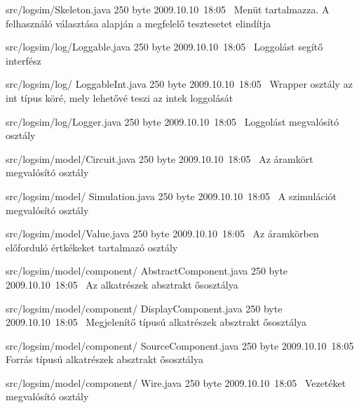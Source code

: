 \begin{fajllista}

\fajl
{src/logsim/Skeleton.java} %
{250 byte} %
{2009.10.10~18:05~} %
{Menüt tartalmazza. A felhasználó választása alapján a megfelelő tesztesetet elindítja} %

\fajl
{src/logsim/log/Loggable.java} %
{250 byte} %
{2009.10.10~18:05~} %
{Loggolást segítő interfész} %

\fajl
{src/logsim/log/\newline
LoggableInt.java} %
{250 byte} %
{2009.10.10~18:05~} %
{Wrapper osztály az int típus köré, mely lehetővé teszi az intek loggolását} %

\fajl
{src/logsim/log/Logger.java} %
{250 byte} %
{2009.10.10~18:05~} %
{Loggolást megvalósító osztály} %

\fajl
{src/logsim/model/Circuit.java} %
{250 byte} %
{2009.10.10~18:05~} %
{Az áramkört megvalósító osztály} %

\fajl
{src/logsim/model/\newline
Simulation.java} %
{250 byte} %
{2009.10.10~18:05~} %
{A szimulációt megvalósító osztály} %

\fajl
{src/logsim/model/Value.java} %
{250 byte} %
{2009.10.10~18:05~} %
{Az áramkörben előforduló értkékeket tartalmazó osztály} %

\fajl
{src/logsim/model/component/\newline
AbstractComponent.java} %
{250 byte} %
{2009.10.10~18:05~} %
{Az alkatrészek absztrakt ősosztálya} %

\fajl
{src/logsim/model/component/\newline
DisplayComponent.java} %
{250 byte} %
{2009.10.10~18:05~} %
{Megjelenítő típusú alkatrészek absztrakt ősosztálya} %

\fajl
{src/logsim/model/component/\newline
SourceComponent.java} %
{250 byte} %
{2009.10.10~18:05~} %
{Forrás típusú alkatrészek absztrakt ősosztálya} %

\fajl
{src/logsim/model/component/\newline
Wire.java} %
{250 byte} %
{2009.10.10~18:05~} %
{Vezetéket megvalósító osztály} %


\end{fajllista}
